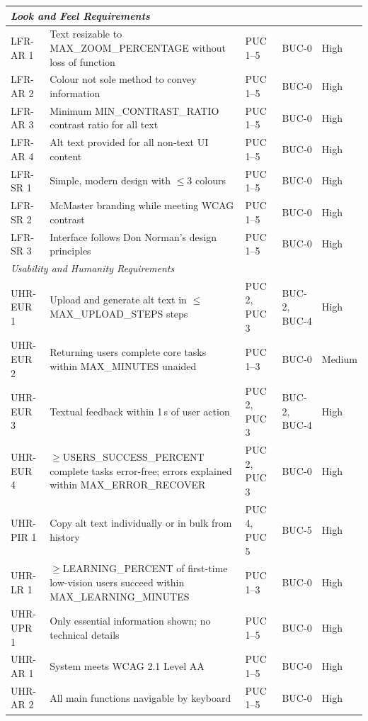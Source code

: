 \documentclass[12pt]{article}
\begin{document}
\begin{longtable}{p{2.2cm}p{5.5cm}p{2.2cm}p{2.0cm}p{1.5cm}}
\multicolumn{5}{l}{\textit{Look and Feel Requirements}} \\
\midrule
LFR-AR 1 & Text resizable to MAX\_ZOOM\_PERCENTAGE without loss of function & PUC 1--5        & BUC-0         & High   \\
LFR-AR 2 & Colour not sole method to convey information               & PUC 1--5           & BUC-0         & High   \\
LFR-AR 3 & Minimum MIN\_CONTRAST\_RATIO contrast ratio for all text    & PUC 1--5           & BUC-0         & High   \\
LFR-AR 4 & Alt text provided for all non-text UI content               & PUC 1--5           & BUC-0         & High   \\
LFR-SR 1 & Simple, modern design with $\leq$3 colours                  & PUC 1--5           & BUC-0         & High   \\
LFR-SR 2 & McMaster branding while meeting WCAG contrast               & PUC 1--5           & BUC-0         & High   \\
LFR-SR 3 & Interface follows Don Norman's design principles            & PUC 1--5           & BUC-0         & High   \\
\midrule

\multicolumn{5}{l}{\textit{Usability and Humanity Requirements}} \\
\midrule
UHR-EUR 1 & Upload and generate alt text in $\leq$MAX\_UPLOAD\_STEPS steps & PUC 2, PUC 3   & BUC-2, BUC-4  & High   \\
UHR-EUR 2 & Returning users complete core tasks within MAX\_MINUTES unaided & PUC 1--3      & BUC-0         & Medium \\
UHR-EUR 3 & Textual feedback within 1\,s of user action                 & PUC 2, PUC 3       & BUC-2, BUC-4  & High   \\
UHR-EUR 4 & $\geq$USERS\_SUCCESS\_PERCENT complete tasks error-free; errors explained within MAX\_ERROR\_RECOVER & PUC 2, PUC 3 & BUC-0 & High \\
UHR-PIR 1 & Copy alt text individually or in bulk from history          & PUC 4, PUC 5       & BUC-5         & High   \\
UHR-LR 1  & $\geq$LEARNING\_PERCENT of first-time low-vision users succeed within MAX\_LEARNING\_MINUTES & PUC 1--3 & BUC-0 & High \\
UHR-UPR 1 & Only essential information shown; no technical details      & PUC 1--5           & BUC-0         & High   \\
UHR-AR 1  & System meets WCAG 2.1 Level AA                              & PUC 1--5           & BUC-0         & High   \\
UHR-AR 2  & All main functions navigable by keyboard                    & PUC 1--5           & BUC-0         & High   \\
\midrule


\end{longtable}
\end{document}

